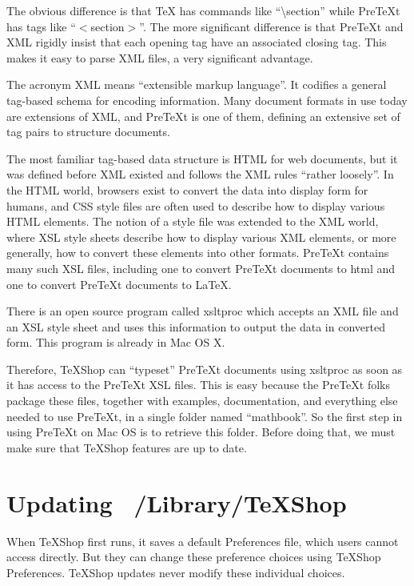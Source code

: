 \documentclass[11pt, oneside]{article}   	%
\begin{document}
The obvious difference is that TeX has commands like ``\textbackslash section'' while PreTeXt has tags like ``$<$section$>$''. The more significant difference is that PreTeXt and XML rigidly insist that each opening tag have an associated closing tag. This makes it easy to parse XML files, a very significant advantage. 

The acronym XML means ``extensible markup language''. It codifies a general tag-based schema for encoding information.  Many document formats in use today are extensions of XML, and PreTeXt is one of them, defining an extensive set of tag pairs to structure documents. 

The most familiar tag-based data structure is HTML for web documents, but it was defined before XML existed and follows the XML rules  ``rather loosely''.  In the HTML world, browsers exist to convert the data into display form for humans, and CSS style files are often used to describe how to display various HTML elements. The notion of a style file was  extended to the XML world, where XSL style sheets describe how to display various XML elements, or more generally, how to convert these elements into other formats. PreTeXt contains many such XSL files, including one to convert PreTeXt documents to html and one to convert PreTeXt documents to LaTeX.

There is an open source program called xsltproc which accepts an XML file and an XSL style sheet and uses this information to output the data in converted form. This program is already in Mac OS X.

Therefore, TeXShop can ``typeset'' PreTeXt documents using xsltproc as soon as it has access to the PreTeXt  XSL files. This is easy because the PreTeXt folks package these files, together with examples, documentation, and everything else needed to use PreTeXt, in a single folder named ``mathbook''. So the first step in using PreTeXt on Mac OS is to retrieve this folder. Before doing that, we must make sure that TeXShop features are up to date.

 
 \section{Updating ~/Library/TeXShop}
 
 When TeXShop first runs, it saves a default Preferences file, which users cannot access directly. But they can change these preference choices using TeXShop Preferences.  TeXShop updates never modify these individual  choices.
 
\end{document}
